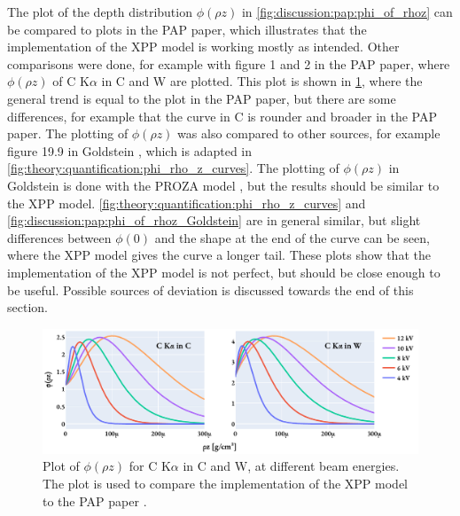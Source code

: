 The plot of the depth distribution $\phi(\rho z)$ in \cref{fig:discussion:pap:phi_of_rhoz} can be compared to plots in the PAP paper\cite{pap_1991}, which illustrates that the implementation of the XPP model is working mostly as intended.
Other comparisons were done, for example with figure 1 and 2 in the PAP paper, where $\phi(\rho z)$ of C K$\alpha$ in C and W are plotted.
This plot is shown in \cref{fig:discussion:pap:phi_of_rhoz_C_Ka}, where the general trend is equal to the plot in the PAP paper, but there are some differences, for example that the curve in C is rounder and broader in the PAP paper.
The plotting of $\phi(\rho z)$ was also compared to other sources, for example figure 19.9 in Goldstein \cite[Fig. 19.9]{goldstein_scanning_2018}, which is adapted in \cref{fig:theory:quantification:phi_rho_z_curves}.
The plotting of $\phi(\rho z)$ in Goldstein is done with the PROZA model \cite{bastin_proza96_1998}, but the results should be similar to the XPP model.
\cref{fig:theory:quantification:phi_rho_z_curves} and \cref{fig:discussion:pap:phi_of_rhoz_Goldstein} are in general similar, but slight differences between $\phi(0)$ and the shape at the end of the curve can be seen, where the XPP model gives the curve a longer tail.
These plots show that the implementation of the XPP model is not perfect, but should be close enough to be useful.
Possible sources of deviation is discussed towards the end of this section.

\begin{figure}[htbp]
    \centering
    \includegraphics[width=0.99\linewidth]{figures/discussion/PAP_phi_of_rhoz_C_Ka.pdf}
    \caption{
        Plot of $\phi(\rho z)$ for C K$\alpha$ in C and W, at different beam energies.
        The plot is used to compare the implementation of the XPP model to the PAP paper \cite[Fig. 1 and 2]{pap_1991}.
    }
    \label{fig:discussion:pap:phi_of_rhoz_C_Ka}
\end{figure}



